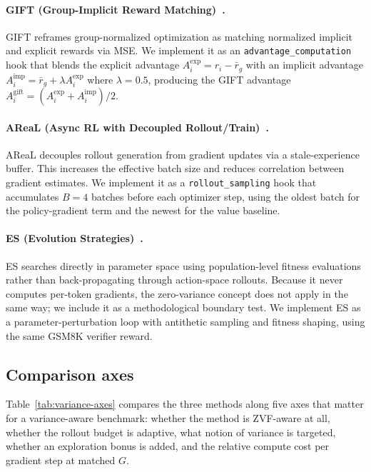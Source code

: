 \paragraph{GIFT (Group-Implicit Reward Matching)~\cite{gift2025}.}
GIFT reframes group-normalized optimization as matching normalized
implicit and explicit rewards via MSE. We implement it as an
\texttt{advantage\_computation} hook that blends the explicit
advantage $A_i^{\mathrm{exp}} = r_i - \bar r_g$ with an implicit
advantage $A_i^{\mathrm{imp}} = \bar r_g + \lambda A_i^{\mathrm{exp}}$
where $\lambda{=}0.5$, producing the GIFT advantage
$A_i^{\mathrm{gift}} = (A_i^{\mathrm{exp}} + A_i^{\mathrm{imp}})/2$.

\paragraph{AReaL (Async RL with Decoupled Rollout/Train)~\cite{areal2025}.}
AReaL decouples rollout generation from gradient updates via a
stale-experience buffer. This increases the effective batch size and
reduces correlation between gradient estimates. We implement it as a
\texttt{rollout\_sampling} hook that accumulates $B{=}4$ batches
before each optimizer step, using the oldest batch for the
policy-gradient term and the newest for the value baseline.

\paragraph{ES (Evolution Strategies)~\cite{es2025}.}
ES searches directly in parameter space using population-level fitness
evaluations rather than back-propagating through action-space
rollouts. Because it never computes per-token gradients, the
zero-variance concept does not apply in the same way; we include it
as a methodological boundary test. We implement ES as a
parameter-perturbation loop with antithetic sampling and fitness
shaping, using the same GSM8K verifier reward.  

\subsection{Comparison axes}
\label{sec:variance-comparison-axes}

Table~\ref{tab:variance-axes} compares the three methods along five
axes that matter for a variance-aware benchmark: whether the method
is ZVF-aware at all, whether the rollout budget is adaptive, what
notion of variance is targeted, whether an exploration bonus is added,
and the relative compute cost per gradient step at matched $G$.

